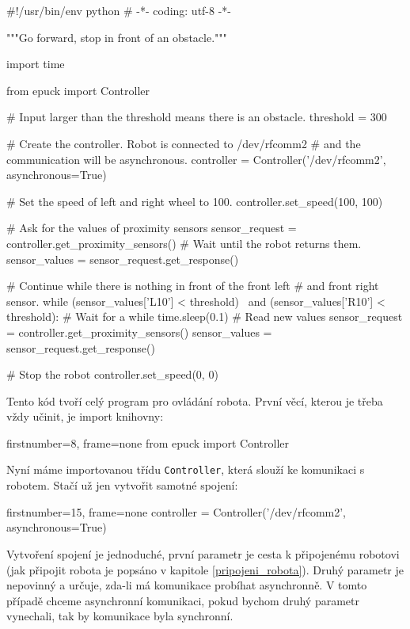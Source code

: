 \documentclass[12pt,notitlepage]{report}
\begin{document}
        \begin{pyc}
#!/usr/bin/env python
# -*- coding: utf-8 -*-

"""Go forward, stop in front of an obstacle."""

import time

from epuck import Controller

# Input larger than the threshold means there is an obstacle.
threshold = 300

# Create the controller. Robot is connected to /dev/rfcomm2
# and the communication will be asynchronous.
controller = Controller('/dev/rfcomm2', asynchronous=True)

# Set the speed of left and right wheel to 100.
controller.set_speed(100, 100)

# Ask for the values of proximity sensors
sensor_request = controller.get_proximity_sensors()
# Wait until the robot returns them.
sensor_values = sensor_request.get_response()

# Continue while there is nothing in front of the front left
# and front right sensor.
while (sensor_values['L10'] < threshold) \
       and (sensor_values['R10'] < threshold):
    # Wait for a while
    time.sleep(0.1)
    # Read new values
    sensor_request = controller.get_proximity_sensors()
    sensor_values = sensor_request.get_response()

# Stop the robot
controller.set_speed(0, 0)
        \end{pyc}

    Tento kód tvoří celý program pro ovládání robota. První věcí, kterou je
    třeba vždy učinit, je import knihovny:

    \begin{pyc*}{firstnumber=8, frame=none}
from epuck import Controller
    \end{pyc*}

    Nyní máme importovanou třídu {\tt Controller}, která slouží ke komunikaci s
    robotem. Stačí už jen vytvořit samotné spojení:

    \begin{pyc*}{firstnumber=15, frame=none}
controller = Controller('/dev/rfcomm2', asynchronous=True)
    \end{pyc*}

    Vytvoření spojení je jednoduché, první parametr je cesta k připojenému
    robotovi (jak připojit robota je popsáno v kapitole
    \ref{pripojeni_robota}). Druhý parametr je nepovinný a určuje, zda-li má
    komunikace probíhat asynchronně. V tomto případě chceme asynchronní
    komunikaci, pokud bychom druhý parametr vynechali, tak by komunikace byla
    synchronní.
\end{document}
